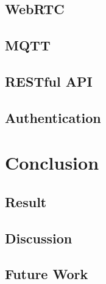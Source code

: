 \documentclass{article}
\begin{document}
    \subsection{WebRTC}

    \subsection{MQTT}

    \subsection{RESTful API}

    \subsection{Authentication}

\pagebreak

\section{Conclusion} 

    \subsection{Result}

    \subsection{Discussion}

    \subsection{Future Work}


\pagebreak



\pagebreak

\end{document}
